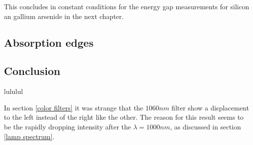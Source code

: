 \documentclass[]{article}
\begin{document}
This concludes in constant conditions for the energy gap measurements for silicon an gallium arsenide in the next chapter.

\subsection{Absorption edges}
\subsection{Conclusion} \label{Conclusion}
lululul

In section \ref{color filters} it was strange that the $1060nm$ filter show a displacement to the left instead of the right like the other. The reason for this result seems to be the rapidly dropping intensity after the $\lambda =1000nm$, as discussed in section \ref{lamp spectrum}. 


\newpage
\end{document}
